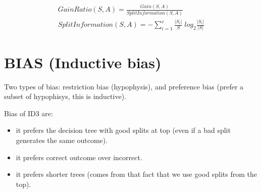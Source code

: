 \documentclass[12pt]{report}
\begin{document}
\begin{gather*}
	GainRatio(S,A)  = \frac{Gain(S,A)}{SplitInformation(S,A)} \\
	SplitInformation(S,A) = - \sum_{i=1}^c \frac{|S_i|}{S} \; log_2\frac{|S_i|}{|S|}
\end{gather*}


\section{BIAS (Inductive bias)}
Two types of bias: restriction bias (hypophysis), and preference bias (prefer a subset of hypophisys, this is inductive).

Bias of ID3 are: 
\begin{itemize}
\item it prefers the decision tree with good splits at top (even if a bad split generates the same outcome).
\item it prefers correct outcome over incorrect. 
\item it prefers shorter trees (comes from that fact that we use good splits from the top).
\end{itemize}



%


\end{document}
